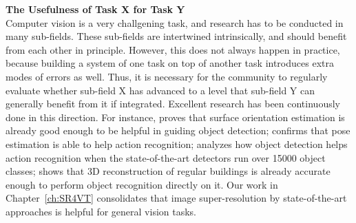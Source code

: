 \textbf{The Usefulness of Task X for Task Y}  \\
Computer vision is a very challgening task, and research has to be conducted in many sub-fields. These sub-fields are intertwined intrinsically, and should benefit from each other in principle. However, this does not always happen in practice, because building a system of one task on top of  another task introduces extra modes of errors as well. Thus, it is necessary for the community to regularly evaluate whether sub-field X has advanced to a level that sub-field Y can generally benefit from it if integrated.   
Excellent research has been continuously done in this direction. For instance,  \citep{hoiem2008putting} proves that surface orientation estimation is already good enough to be helpful in guiding object detection;
\citep{eth_biwi_00883} confirms that pose estimation is able to help action recognition; \citep{15000object} analyzes how object detection helps action recognition when the state-of-the-art detectors run over 15000 object classes;   
\citep{martinovic20153d} shows that  3D reconstruction of regular buildings is already accurate enough to perform object recognition directly on it. Our work in Chapter~\ref{ch:SR4VT} consolidates that image super-resolution by state-of-the-art approaches is helpful for general vision tasks. 
 
